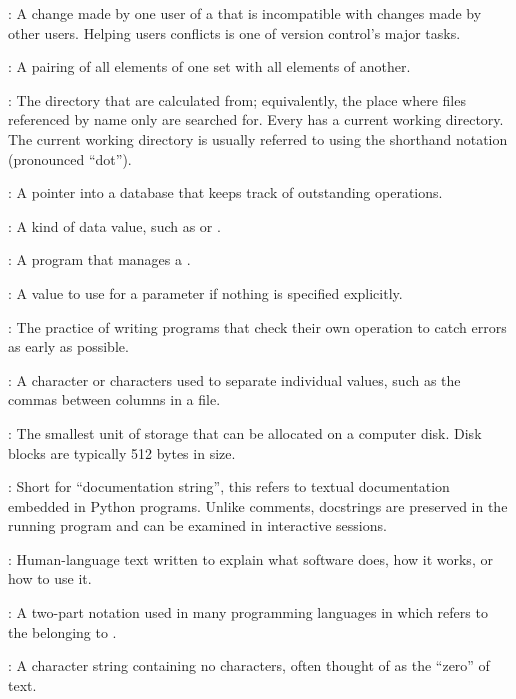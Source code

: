 :
A change made by one user of a
 that is
incompatible with changes made by other users. Helping users
 conflicts is one of version control's
major tasks.

:
A pairing of all elements of one set with all
elements of another.

:
The directory that
 are calculated from;
equivalently, the place where files referenced by name only are searched
for. Every  has a current working
directory. The current working directory is usually referred to using
the shorthand notation  (pronounced ``dot'').

:
A pointer into a database that keeps track of
outstanding operations.

:
A kind of data value, such as
 or .

:
A program that manages a
.

:
A value to use for a parameter if
nothing is specified explicitly.

:
The practice of writing programs that
check their own operation to catch errors as early as possible.

:
A character or characters used to separate
individual values, such as the commas between columns in a
 file.

:
The smallest unit of storage that can be allocated
on a computer disk. Disk blocks are typically 512 bytes in size.

:
Short for ``documentation string'', this refers to
textual documentation embedded in Python programs. Unlike comments,
docstrings are preserved in the running program and can be examined in
interactive sessions.

:
Human-language text written to explain what
software does, how it works, or how to use it.

:
A two-part notation used in many programming
languages in which  refers to the
 belonging to .

:
A character string containing no characters,
often thought of as the ``zero'' of text.

